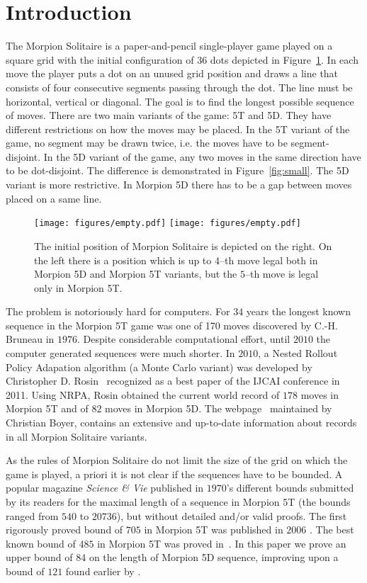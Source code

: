 \section{Introduction}
The Morpion Solitaire is a paper-and-pencil single-player game played on a square grid with 
  the initial configuration of 36 dots depicted in Figure~\ref{fig:initial}. 
In each move the player puts a dot on an unused grid position and draws a line that 
  consists of four consecutive segments passing through the dot. 
The line must be horizontal, vertical or diagonal. 
The goal is to find the longest possible sequence of moves.
There are two main variants of the game: 5T and 5D. 
They have different restrictions on how the moves may be placed.
In the 5T variant of the game, no segment may be drawn twice, i.e. the moves have to be segment-disjoint. 
In the 5D variant of the game, any two moves in the same direction have to be dot-disjoint.
The difference is demonstrated in Figure~\ref{fig:small}.
The 5D variant is more restrictive. In Morpion 5D there has to be a gap between moves
  placed on a same line.


  \begin{figure}
    \centering
      \texttt{[image: figures/empty.pdf]}
      \texttt{[image: figures/empty.pdf]}
      \caption{\label{fig:initial}
	The initial position of Morpion Solitaire is depicted on the right. On the left there is a position which is up to $4$--th move legal 
both in Morpion 5D and Morpion 5T variants, but the $5$--th move is legal only in Morpion 5T. 
      }
\end{figure}

The problem is notoriously hard for computers. 
For $34$ years the longest known sequence in the Morpion 5T game
  was one of 170 moves discovered by C.-H. Bruneau in $1976$. 
Despite considerable computational effort, until $2010$ the computer generated
  sequences were much shorter.
In $2010$, a Nested Rollout Policy Adapation algorithm (a Monte Carlo variant) 
  was developed by Christopher D. Rosin~\cite{rosin} recognized as a best paper of the IJCAI conference in 2011.
Using NRPA, Rosin obtained the current world record of $178$ moves in Morpion 5T 
  and of $82$ moves in Morpion 5D.
The webpage~\cite{boyer} maintained by Christian Boyer, contains an extensive and up-to-date information about records in all Morpion Solitaire variants.

As the rules of Morpion Solitaire do not limit the size of the grid on which the game is played, a priori
  it is not clear if the sequences have to be bounded.
A popular magazine \emph{Science \& Vie} published in $1970$'s different bounds submitted by its readers 
  for the maximal length of a sequence in Morpion 5T
  (the bounds ranged from $540$ to $20736$), but without detailed and/or valid proofs.
The first rigorously proved bound of $705$ in Morpion 5T was published in $2006$ \cite[Demaine et al.]{demaine}.
The best known bound of $485$ in Morpion 5T was proved in~\cite{ijcai}.
In this paper we prove an upper bound of $84$ on the length of Morpion 5D sequence, 
improving upon a bound of $121$ found earlier by \cite[Kawamura et al.]{japonczycy}.

